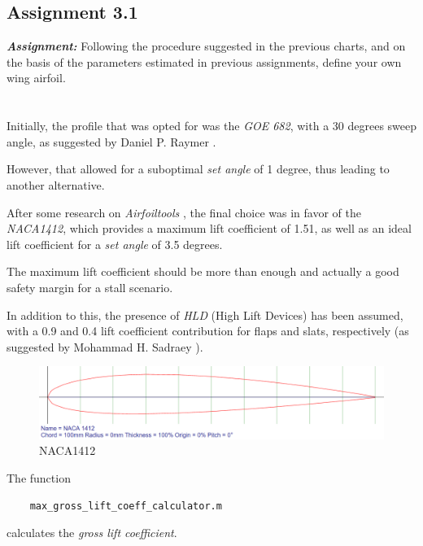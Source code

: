 \documentclass{article}
\begin{document}
\subsection{Assignment 3.1\label{Assignment_3.1}}

\textbf{\textit{Assignment:}} Following the procedure suggested in the previous charts,
and on the basis of the parameters estimated in previous assignments,
define your own wing airfoil. \\ \\ \\ 

Initially, the profile that was opted for was the \textit{GOE 682}, with a 30 degrees sweep angle, 
as suggested by Daniel P. Raymer \autocite{Raymer_Daniel}.

However, that allowed for a suboptimal \textit{set angle} of 1 degree, thus leading to another alternative.

After some research on \textit{Airfoiltools} \autocite{Airfoiltools}, the final choice was in favor
of the \textit{NACA1412}, which provides a maximum lift coefficient of 1.51, as well as an ideal lift coefficient
for a \textit{set angle} of 3.5 degrees.

The maximum lift coefficient should be more than enough and actually a good safety margin 
for a stall scenario.

In addition to this, the presence of \textit{HLD} (High Lift Devices) has been assumed, with 
a 0.9 and 0.4 lift coefficient contribution for flaps and slats, respectively (as suggested by Mohammad H. Sadraey \autocite{Sadraey_Mohammad}).\\ 

\begin{figure}[h!]
    \centering
    \includegraphics[width=\textwidth]{Sources/Plots_and_Pictures/NACA1412.png}
    \caption{NACA1412}
    \label{NACA1412}
\end{figure}
\clearpage

The function \autocite{Airbus_replacement_repo} 
\begin{verbatim}
    max_gross_lift_coeff_calculator.m
\end{verbatim}
calculates the \textit{gross lift coefficient}.\\
\end{document}
